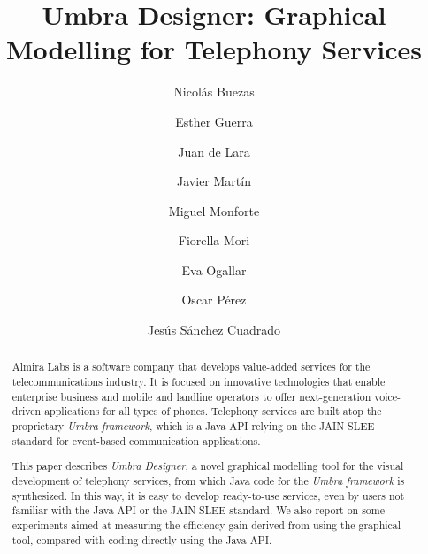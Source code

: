 \documentclass{llncs}
\begin{document}
\pagestyle{headings} %

\title{Umbra Designer: Graphical Modelling for Telephony Services} %

\author{Nicol\'as Buezas \and Esther Guerra \and Juan de Lara \and Javier Mart\'in \and Miguel Monforte \and Fiorella Mori \and Eva Ogallar \and Oscar P\'erez \and Jes\'us S\'anchez Cuadrado}



\maketitle

\begin{abstract}
Almira Labs is a software company that develops value-added services for the telecommunications industry.
It is focused on innovative technologies that enable enterprise business and mobile and landline operators
to offer next-generation voice-driven applications for all types of phones. Telephony services are built atop 
the proprietary {\em Umbra framework}, which is a Java API relying on the JAIN SLEE standard for event-based 
communication applications.

This paper describes {\em Umbra Designer}, a novel graphical modelling tool for the visual development of 
telephony services, from which Java code for the {\em Umbra framework} is synthesized. In this way, it is easy
to develop ready-to-use services, even by users not familiar with the Java API or the JAIN SLEE standard. We also 
report on some experiments aimed at measuring the efficiency gain derived from using the graphical tool, compared
with coding directly using the Java API.
\end{abstract}
\end{document}
